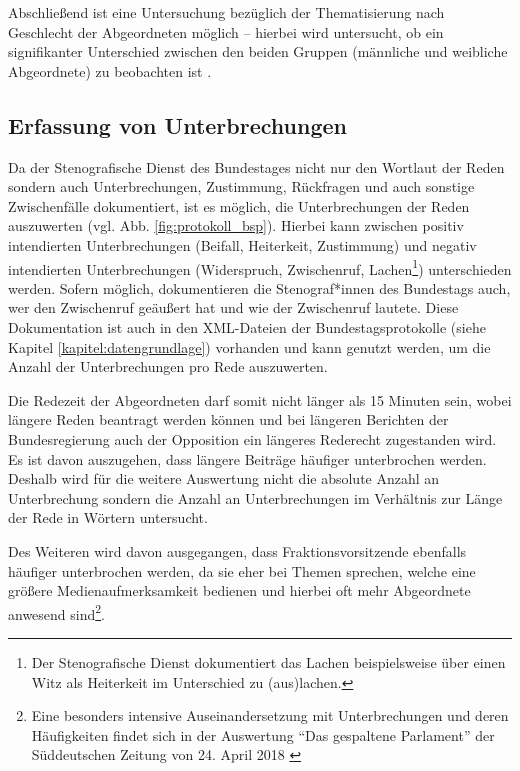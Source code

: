 \documentclass[12pt, 
    twoside=false, 
    bibliography=totoc, 
    numbers=endperiod, 
    headings=normal, 
    toc=chapterentrydotfill
    ]{scrbook}
\begin{document}
Abschließend ist eine Untersuchung bezüglich der Thematisierung nach Geschlecht der Abgeordneten möglich -- hierbei wird untersucht, ob ein signifikanter Unterschied zwischen den beiden Gruppen (männliche und weibliche Abgeordnete) zu beobachten ist \parencite[vgl.][3]{roberts_2013}. 


\subsection{Erfassung von Unterbrechungen}\label{kapitel:erfassung_unterbrechung}

Da der Stenografische Dienst des Bundestages nicht nur den Wortlaut der Reden sondern auch Unterbrechungen, Zustimmung, Rückfragen und auch sonstige Zwischenfälle dokumentiert, ist es möglich, die Unterbrechungen der Reden auszuwerten (vgl. Abb. \ref{fig:protokoll_bsp}). Hierbei kann zwischen positiv intendierten Unterbrechungen (Beifall, Heiterkeit, Zustimmung) und negativ intendierten Unterbrechungen (Widerspruch, Zwischenruf, Lachen\footnote{Der Stenografische Dienst dokumentiert das Lachen beispielsweise über einen Witz als Heiterkeit im Unterschied zu (aus)lachen.}) unterschieden werden.
Sofern möglich, dokumentieren die Stenograf*innen des Bundestags auch, wer den Zwischenruf geäußert hat und wie der Zwischenruf lautete. Diese Dokumentation ist auch in den XML-Dateien der Bundestagsprotokolle (siehe Kapitel \ref{kapitel:datengrundlage}) vorhanden und kann genutzt werden, um die Anzahl der Unterbrechungen pro Rede auszuwerten.

 Die Redezeit der Abgeordneten darf somit nicht länger als 15 Minuten sein, wobei längere Reden beantragt werden können und bei längeren Berichten der Bundesregierung auch der Opposition ein längeres Rederecht zugestanden wird. Es ist davon auszugehen, dass längere Beiträge häufiger unterbrochen werden. Deshalb wird für die weitere Auswertung nicht die absolute Anzahl an Unterbrechung sondern die Anzahl an Unterbrechungen im Verhältnis zur Länge der Rede in Wörtern untersucht.

Des Weiteren wird davon ausgegangen, dass Fraktionsvorsitzende ebenfalls häufiger unterbrochen werden, da sie eher bei Themen sprechen, welche eine größere Medienaufmerksamkeit bedienen und hierbei oft mehr Abgeordnete anwesend sind\footnote{Eine besonders intensive Auseinandersetzung mit Unterbrechungen und deren Häufigkeiten findet sich in der Auswertung \enquote{Das gespaltene Parlament} der Süddeutschen Zeitung von 24. April 2018 \parencite{sueddeutsche_2018}}.
\end{document}
